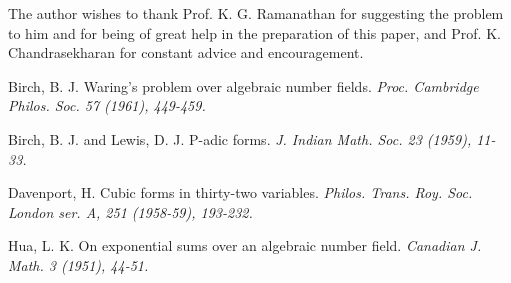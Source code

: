 The author wishes to thank Prof. K. G. Ramanathan for suggesting the problem to him and for being of great help in the preparation of this paper, and Prof. K. Chandrasekharan for constant advice and encouragement. 



\begin{thebibliography}{99}
 Birch, B. J. Waring's problem over algebraic number fields. {\em Proc. Cambridge Philos. Soc. 57 (1961), 449-459.}

 Birch, B. J. and Lewis, D. J. P-adic forms. {\em J. Indian Math. Soc. 23 (1959), 11-33.} 

 Davenport, H. Cubic forms in thirty-two variables. {\em Philos. Trans. Roy. Soc. London ser. A, 251 (1958-59), 193-232.}

 Hua, L. K. On exponential sums over an algebraic number field. {\em Canadian J. Math. 3 (1951), 44-51.}

\end{thebibliography} 
